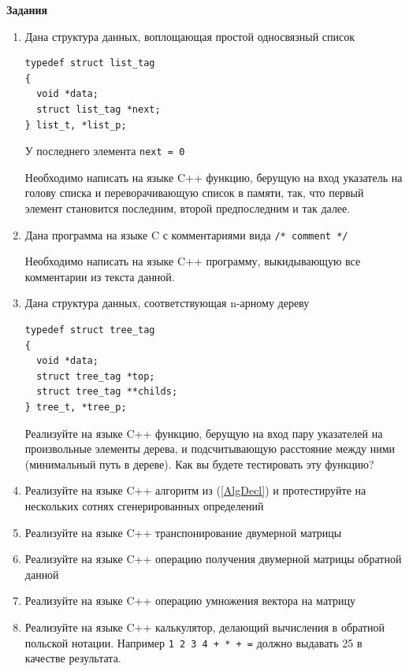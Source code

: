 \documentclass[a4paper,12pt,oneside]{article}
\begin{document}
\textbf{Задания} 

\begin{enumerate}
\item
Дана структура данных, воплощающая простой односвязный список

\begin{lstlisting}
typedef struct list_tag
{
  void *data;
  struct list_tag *next;
} list_t, *list_p;
\end{lstlisting}

У последнего элемента \lstinline!next = 0!

Необходимо написать на языке C++ функцию, берущую на вход указатель на голову списка и переворачивающую список в памяти, так, что первый элемент становится последним, второй предпоследним и так далее.

\item
Дана программа на языке C с комментариями вида \lstinline!/* comment */!

Необходимо написать на языке C++ программу, выкидывающую все комментарии из текста данной.

\item
Дана структура данных, соответствующая n-арному дереву

\begin{lstlisting}
typedef struct tree_tag
{
  void *data;
  struct tree_tag *top;
  struct tree_tag **childs;
} tree_t, *tree_p;
\end{lstlisting}

Реализуйте на языке C++ функцию, берущую на вход пару указателей на произвольные элементы дерева, и подсчитывающую расстояние между ними (минимальный путь в дереве). Как вы будете тестировать эту функцию?

\item
Реализуйте на языке C++ алгоритм из (\ref{AlgDecl}) и протестируйте на нескольких сотнях сгенерированных определений

\item
Реализуйте на языке C++ транспонирование двумерной матрицы

\item
Реализуйте на языке C++ операцию получения двумерной матрицы обратной данной

\item
Реализуйте на языке C++ операцию умножения вектора на матрицу

\item
Реализуйте на языке C++ калькулятор, делающий вычисления в обратной польской нотации. Например \lstinline!1 2 3 4 + * + =! должно выдавать 25 в качестве результата.


\end{enumerate}
\end{document}
